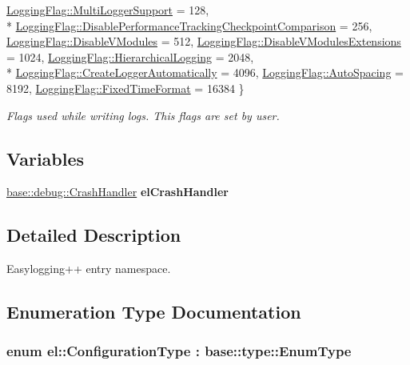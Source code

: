 \begin{DoxyCompactItemize}
\hyperlink{namespaceel_a2784aacd04cb7816ac1c0b20fcbf83cbaa2ce18adf399149a1b75bdafa773617e}{Logging\-Flag\-::\-Multi\-Logger\-Support} = 128, 
\\*
\hyperlink{namespaceel_a2784aacd04cb7816ac1c0b20fcbf83cba18ea5964e8caa7c476dd5eee8e4f74a0}{Logging\-Flag\-::\-Disable\-Performance\-Tracking\-Checkpoint\-Comparison} = 256, 
\hyperlink{namespaceel_a2784aacd04cb7816ac1c0b20fcbf83cba22cae5066e8e0623cb90e20a18abb631}{Logging\-Flag\-::\-Disable\-V\-Modules} = 512, 
\hyperlink{namespaceel_a2784aacd04cb7816ac1c0b20fcbf83cba18a8e65b84ca0cc82451b5e155d7aeb4}{Logging\-Flag\-::\-Disable\-V\-Modules\-Extensions} = 1024, 
\hyperlink{namespaceel_a2784aacd04cb7816ac1c0b20fcbf83cba477de0500d7a5b64a4500d82811fc058}{Logging\-Flag\-::\-Hierarchical\-Logging} = 2048, 
\\*
\hyperlink{namespaceel_a2784aacd04cb7816ac1c0b20fcbf83cba2afa5afe77105aadedcbb90dd8547cc3}{Logging\-Flag\-::\-Create\-Logger\-Automatically} = 4096, 
\hyperlink{namespaceel_a2784aacd04cb7816ac1c0b20fcbf83cba34620f140246d3c3b68c17fdf7b8ada7}{Logging\-Flag\-::\-Auto\-Spacing} = 8192, 
\hyperlink{namespaceel_a2784aacd04cb7816ac1c0b20fcbf83cbaebbb601e28e0cf821dfe13b4a7cf409e}{Logging\-Flag\-::\-Fixed\-Time\-Format} = 16384
 \}
\begin{DoxyCompactList}\small\item\em Flags used while writing logs. This flags are set by user. \end{DoxyCompactList}\end{DoxyCompactItemize}
\subsection*{Variables}
\begin{DoxyCompactItemize}
\item 
\hypertarget{namespaceel_ab9770514f33aef6683dbba37be2b471d}{\hyperlink{classel_1_1base_1_1debug_1_1CrashHandler}{base\-::debug\-::\-Crash\-Handler} {\bfseries el\-Crash\-Handler}}\label{namespaceel_ab9770514f33aef6683dbba37be2b471d}

\end{DoxyCompactItemize}


\subsection{Detailed Description}
Easylogging++ entry namespace. 

\subsection{Enumeration Type Documentation}
\hypertarget{namespaceel_a281f5db6d6163678bc68a8b23b59e124}{
\subsubsection[{Configuration\-Type}]{\setlength{\rightskip}{0pt plus 5cm}enum {\bf el\-::\-Configuration\-Type} \-: base\-::type\-::\-Enum\-Type\hspace{0.3cm}{\ttfamily [strong]}}}\label{namespaceel_a281f5db6d6163678bc68a8b23b59e124}


